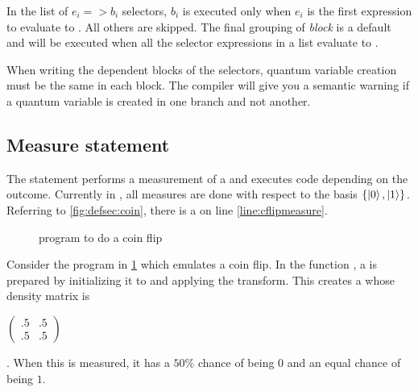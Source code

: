 In the list of $e_i => b_i$ selectors, 
$b_i$ is executed only when $e_i$ is the first expression to
evaluate to . All others are skipped. The final 
grouping of  \emph{block} is a default and will be
executed when all the  selector expressions in a list
  evaluate to .

When writing the dependent blocks of the selectors,
 quantum variable creation must be
the same in each block.
 The compiler will give you a semantic
warning if a quantum variable is created in one branch and not another.


\subsection{Measure statement}\label{subsec:measurestatements}

The  statement performs a measurement of a \qubit{} and
executes code depending on the outcome. Currently in \lqpl{}, all
measures are done with respect to the basis $\{\left\vert{0}\right\rangle,\left\vert{1}\right\rangle\}$. 
Referring to  \vref{fig:defsec:coin}, there is a
 on line \ref{line:cflipmeasure}. 


\begin{figure}[htbp]
\centering
{}\qquad
{}
\caption{\lqpl{} program to do a coin flip}\label{fig:defsec:coin}
\end{figure}

Consider the  program in \ref{fig:defsec:coin} which emulates a coin flip.
In the function ,  a \qubit{} is prepared by initializing it
to  and applying the \Had{} transform. This creates a \qubit{} 
whose density matrix is {\begin{singlespace}$\begin{pmatrix}.5&.5\\ 
.5&.5\end{pmatrix}$\end{singlespace}}. When
 this \qubit{} is measured, it has a $50\%$ chance of being $0$ and 
an equal chance of being $1$. 

